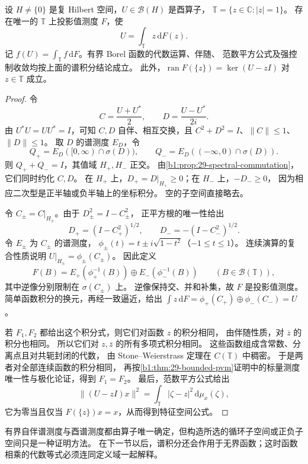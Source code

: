 \begin{theorem}[酉算子的谱测度]
\label{b1:thm:29-unitary-spectral}
设 \(H\ne\{0\}\) 是复 Hilbert 空间，\(U\in\mathcal B(H)\) 是酉算子，
\(\mathbb T=\{z\in\mathbb C:|z|=1\}\)。
存在唯一的 \(\mathbb T\) 上投影值测度 \(F\)，使
\[
 U=\int_{\mathbb T}z\,\mathrm{d}F(z).
\]
记 \(f(U)=\int_{\mathbb T}f\,\mathrm{d}F\)。有界 Borel 函数的代数运算、伴随、
范数平方公式及强控制收敛均按上面的谱积分结论成立。
此外，\(\operatorname{ran}F(\{z\})=\ker(U-zI)\) 对 \(z\in\mathbb T\) 成立。
\end{theorem}
\begin{proof}
令
\[
 C=\frac{U+U^*}{2},\qquad D=\frac{U-U^*}{2i}.
\]
由 \(U^*U=UU^*=I\)，可知 \(C,D\) 自伴、相互交换，且
\(C^2+D^2=I\)、\(\|C\|\leq1\)、\(\|D\|\leq1\)。
取 \(D\) 的谱测度 \(E_D\)，令
\[
 Q_+=E_D([0,\infty)\cap\sigma(D)),\qquad
 Q_-=E_D((-\infty,0)\cap\sigma(D)).
\]
则 \(Q_++Q_-=I\)，其值域 \(H_+,H_-\) 正交。
由\cref{b1:prop:29-spectral-commutation}，它们同时约化 \(C,D\)。
在 \(H_+\) 上，\(D_+=D|_{H_+}\geq0\)；在 \(H_-\) 上，\(-D_-\geq0\)，
因为相应二次型是正半轴或负半轴上的坐标积分。
空的子空间直接略去。

令 \(C_\pm=C|_{H_\pm}\)。由于 \(D_\pm^2=I-C_\pm^2\)，
正平方根的唯一性给出
\[
 D_+=(I-C_+^2)^{1/2},\qquad
 D_-=-(I-C_-^2)^{1/2}.
\]
令 \(E_\pm\) 为 \(C_\pm\) 的谱测度，
\(\phi_\pm(t)=t\pm i\sqrt{1-t^2}\)（\(-1\leq t\leq1\)）。
连续演算的复合性质说明 \(U|_{H_\pm}=\phi_\pm(C_\pm)\)。
因此定义
\[
 F(B)=E_+(\phi_+^{-1}(B))\oplus E_-(\phi_-^{-1}(B))
 \qquad(B\in\mathcal B(\mathbb T)),
\]
其中逆像分别限制在 \(\sigma(C_\pm)\) 上。
逆像保持交、并和补集，故 \(F\) 是投影值测度。
简单函数积分的换元，再经一致逼近，给出
\(\int z\,\mathrm{d}F=\phi_+(C_+)\oplus\phi_-(C_-)=U\)。

若 \(F_1,F_2\) 都给出这个积分式，则它们对函数 \(z\) 的积分相同，
由伴随性质，对 \(\overline z\) 的积分也相同。
所以它们对 \(z,\overline z\) 的所有多项式积分相同。
这些函数组成含常数、分离点且对共轭封闭的代数，
由 Stone--Weierstrass 定理在 \(C(\mathbb T)\) 中稠密。
于是两者对全部连续函数的积分相同，
再按\cref{b1:thm:29-bounded-pvm}证明中的标量测度唯一性与极化论证，得到 \(F_1=F_2\)。
最后，范数平方公式给出
\[
 \|(U-zI)x\|^2=\int_{\mathbb T}|\zeta-z|^2\,\mathrm{d}\mu_x(\zeta),
\]
它为零当且仅当 \(F(\{z\})x=x\)，从而得到特征空间公式。
\end{proof}

有界自伴谱测度与酉谱测度都由算子唯一确定，但构造所选的循环子空间或正负子空间只是一种证明方法。
在下一节以后，谱积分还会作用于无界函数；这时函数相乘的代数等式必须连同定义域一起解释。
